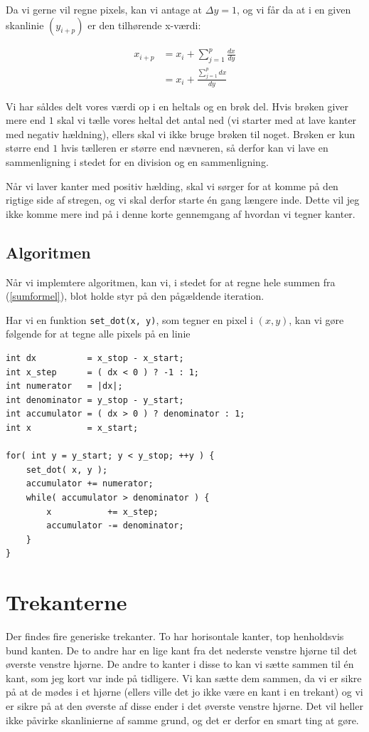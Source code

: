 \documentclass[a4paper, 10pt]{article}
\begin{document}
Da vi gerne vil regne pixels, kan vi antage at $\Delta y = 1$, og vi får da at i en given skanlinie $(y_{i+p})$ er den tilhørende x-værdi: 

\begin{align}
x_{i+p} &= x_i + \sum^p_{j=1} \frac{dx}{dy} \nonumber\\
        &= x_i + \frac{\sum^p_{j=1}dx}{dy}
\end{align}

Vi har såldes delt vores værdi op i en heltals og en brøk del.
Hvis brøken giver mere end $1$ skal vi tælle vores heltal det antal ned (vi starter med at lave kanter med negativ hældning), ellers skal vi ikke bruge brøken til noget.
Brøken er kun større end $1$ hvis tælleren er større end nævneren, så derfor kan vi lave en sammenligning i stedet for en division og en sammenligning.

Når vi laver kanter med positiv hælding, skal vi sørger for at komme på den rigtige side af stregen, og vi skal derfor starte én gang længere inde.
Dette vil jeg ikke komme mere ind på i denne korte gennemgang af hvordan vi tegner kanter.

\subsection{Algoritmen}
Når vi implemtere algoritmen, kan vi, i stedet for at regne hele summen fra (\ref{sumformel}), blot holde styr på den pågældende iteration.

Har vi en funktion \texttt{set\_dot(x, y)}, som tegner en pixel i $(x,y)$, kan vi gøre følgende for at tegne alle pixels på en linie

\begin{lstlisting}
int dx          = x_stop - x_start;
int x_step      = ( dx < 0 ) ? -1 : 1;
int numerator   = |dx|;
int denominator = y_stop - y_start;
int accumulator = ( dx > 0 ) ? denominator : 1;
int x           = x_start;

for( int y = y_start; y < y_stop; ++y ) {
    set_dot( x, y );
    accumulator += numerator;
    while( accumulator > denominator ) {
        x           += x_step;
        accumulator -= denominator;
    }
}
\end{lstlisting}

\section{Trekanterne}
Der findes fire generiske trekanter.
To har horisontale kanter, top henholdsvis bund kanten.
De to andre har en lige kant fra det nederste venstre hjørne til det øverste venstre hjørne.
De andre to kanter i disse to kan vi sætte sammen til én kant, som jeg kort var inde på tidligere.
Vi kan sætte dem sammen, da vi er sikre på at de mødes i et hjørne (ellers ville det jo ikke være en kant i en trekant) og vi er sikre på at den øverste af disse ender i det øverste venstre hjørne.
Det vil heller ikke påvirke skanlinierne af samme grund, og det er derfor en smart ting at gøre.
\end{document}
